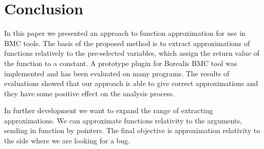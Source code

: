\section{Conclusion}
In this paper we presented an approach to function approximation for use in BMC tools. The basis of the proposed method is to extract approximations of functions relatively to the pre-selected variables, which assign the return value of the function to a constant. A prototype plugin for Borealis BMC tool was implemented and has been evaluated on many programs. The results of evaluations showed that our approach is able to give correct approximations and they have some positive effect on the analysis process.

In further development we want to expand the range of extracting approximations. We can approximate functions relativity to the arguments, sending in function by pointers. The final objective is approximation relativity to the side where we are looking for a bug.
